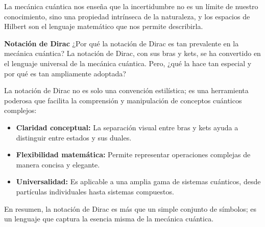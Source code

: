 \documentclass[]{unirTema}
\begin{document}
\begin{questions}
\begin{solution}
    La mecánica cuántica nos enseña que la incertidumbre no es un límite de nuestro conocimiento, sino una propiedad intrínseca de la naturaleza, y los espacios de Hilbert son el lenguaje matemático que nos permite describirla.
  \end{solution}


  \question \textbf{Notación de Dirac}
  ¿Por qué la notación de Dirac es tan prevalente en la mecánica cuántica?
  La notación de Dirac, con sus bras y kets, se ha convertido en el lenguaje universal de la mecánica cuántica. Pero, ¿qué la hace tan especial y por qué es tan ampliamente adoptada?
  \begin{solution}
    La notación de Dirac no es solo una convención estilística; es una herramienta poderosa que facilita la comprensión y manipulación de conceptos cuánticos complejos:

    \begin{itemize}
      \item \textbf{Claridad conceptual:} La separación visual entre bras y kets ayuda a distinguir entre estados y sus duales.

      \item \textbf{Flexibilidad matemática:} Permite representar operaciones complejas de manera concisa y elegante.

      \item \textbf{Universalidad:} Es aplicable a una amplia gama de sistemas cuánticos, desde partículas individuales hasta sistemas compuestos.
    \end{itemize}

    En resumen, la notación de Dirac es más que un simple conjunto de símbolos; es un lenguaje que captura la esencia misma de la mecánica cuántica.
  \end{solution}
\end{questions}
\end{document}
